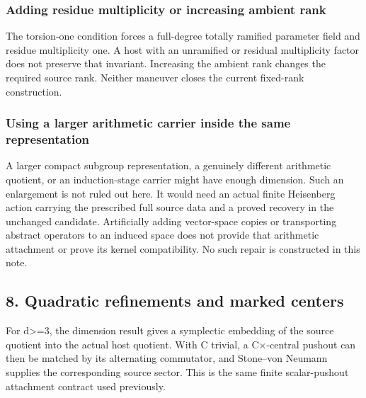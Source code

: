\hypertarget{dyadic_capacity-adding-residue-multiplicity-or-increasing-ambient-rank}{%
\subsubsection{Adding residue multiplicity or increasing ambient
rank}\label{dyadic_capacity-adding-residue-multiplicity-or-increasing-ambient-rank}}

The torsion-one condition forces a full-degree totally ramified
parameter field and residue multiplicity one. A host with an unramified
or residual multiplicity factor does not preserve that invariant.
Increasing the ambient rank changes the required source rank. Neither
maneuver closes the current fixed-rank construction.

\hypertarget{dyadic_capacity-using-a-larger-arithmetic-carrier-inside-the-same-representation}{%
\subsubsection{Using a larger arithmetic carrier inside the same
representation}\label{dyadic_capacity-using-a-larger-arithmetic-carrier-inside-the-same-representation}}

A larger compact subgroup representation, a genuinely different
arithmetic quotient, or an induction-stage carrier might have enough
dimension. Such an enlargement is not ruled out here. It would need an
actual finite Heisenberg action carrying the prescribed full source data
and a proved recovery in the unchanged candidate. Artificially adding
vector-space copies or transporting abstract operators to an induced
space does not provide that arithmetic attachment or prove its kernel
compatibility. No such repair is constructed in this note.

\hypertarget{dyadic_capacity-quadratic-refinements-and-marked-centers}{%
\subsection{8. Quadratic refinements and marked
centers}\label{dyadic_capacity-quadratic-refinements-and-marked-centers}}

For d\textgreater=3, the dimension result gives a symplectic embedding
of the source quotient into the actual host quotient. With C trivial, a
C×-central pushout can then be matched by its alternating commutator,
and Stone--von Neumann supplies the corresponding source sector. This is
the same finite scalar-pushout attachment contract used previously.

